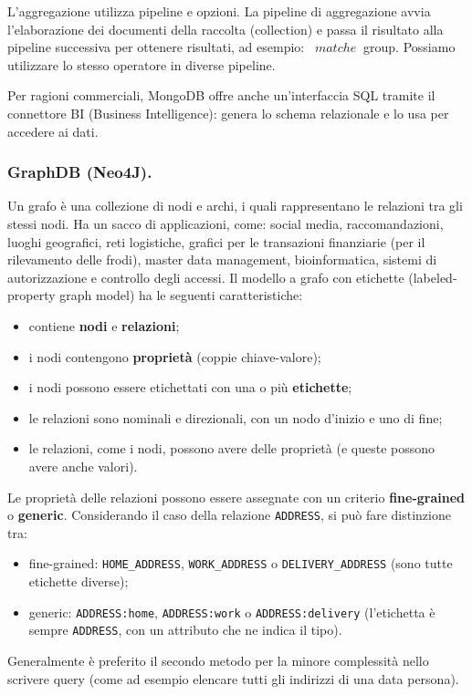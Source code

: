\documentclass[a4page, 11pt]{article}
\begin{document}
L'aggregazione utilizza pipeline e opzioni.
La pipeline di aggregazione avvia l'elaborazione dei documenti della raccolta (collection) e passa il risultato alla pipeline successiva per ottenere risultati, ad esempio: \ $ match e \ $ group.
Possiamo utilizzare lo stesso operatore in diverse pipeline.

Per ragioni commerciali, MongoDB offre anche un'interfaccia SQL tramite il connettore BI (Business Intelligence): genera lo schema relazionale e lo usa per accedere ai dati.


\subsubsection{GraphDB (Neo4J).}
Un grafo è una collezione di nodi e archi, i quali rappresentano le relazioni tra gli stessi nodi.
Ha un sacco di applicazioni, come: social media, raccomandazioni, luoghi geografici, reti logistiche, grafici per le transazioni finanziarie (per il rilevamento delle frodi), master data management, bioinformatica, sistemi di autorizzazione e controllo degli accessi. \newline
Il modello a grafo con etichette (labeled-property graph model) ha le seguenti caratteristiche:
\begin{itemize}[noitemsep]
\item contiene \textbf{nodi} e \textbf{relazioni};
\item i nodi contengono \textbf{proprietà} (coppie chiave-valore);
\item i nodi possono essere etichettati con una o più \textbf{etichette};
\item le relazioni sono nominali e direzionali, con un nodo d'inizio e uno di fine;
\item le relazioni, come i nodi, possono avere delle proprietà (e queste possono avere anche valori).
\end{itemize}
Le proprietà delle relazioni possono essere assegnate con un criterio \textbf{fine-grained} o \textbf{generic}. Considerando il caso della relazione \texttt{ADDRESS}, si può fare distinzione tra:
\begin{itemize}
\item fine-grained: \texttt{HOME\_ADDRESS}, \texttt{WORK\_ADDRESS} o \texttt{DELIVERY\_ADDRESS} (sono tutte etichette diverse);
\item generic: \texttt{ADDRESS:home}, \texttt{ADDRESS:work} o \texttt{ADDRESS:delivery} (l'etichetta è sempre \texttt{ADDRESS}, con un attributo che ne indica il tipo).
\end{itemize}
Generalmente è preferito il secondo metodo per la minore complessità nello scrivere query (come ad esempio elencare tutti gli indirizzi di una data persona).
\end{document}
